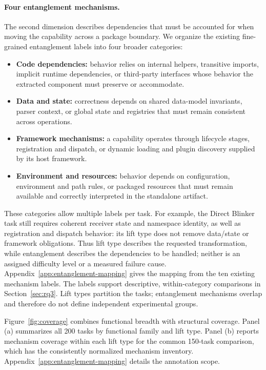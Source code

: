 \documentclass[acmsmall,screen,review,anonymous,nonacm]{acmart}
\begin{document}
\paragraph{Four entanglement mechanisms.}
\label{sec:entanglement}
The second dimension describes dependencies that must be accounted for when
moving the capability across a package boundary. We organize the existing
fine-grained entanglement labels into four broader categories:
\begin{itemize}
 \item \textbf{Code dependencies:} behavior relies on internal helpers,
 transitive imports, implicit runtime dependencies, or third-party interfaces
 whose behavior the extracted component must preserve or accommodate.
 \item \textbf{Data and state:} correctness depends on shared data-model
 invariants, parser context, or global state and registries that must remain
 consistent across operations.
 \item \textbf{Framework mechanisms:} a capability operates through lifecycle
 stages, registration and dispatch, or dynamic loading and plugin discovery
 supplied by its host framework.
 \item \textbf{Environment and resources:} behavior depends on configuration,
 environment and path rules, or packaged resources that must remain available
 and correctly interpreted in the standalone artifact.
\end{itemize}

These categories allow multiple labels per task. For example, the Direct
Blinker task still requires coherent receiver state and namespace identity,
as well as registration and dispatch behavior: its lift type does not remove
data/state or framework obligations. Thus lift type describes the requested
transformation, while entanglement describes the dependencies to be handled;
neither is an assigned difficulty level or a measured failure cause.
Appendix~\ref{app:entanglement-mapping} gives the mapping from the ten existing
mechanism labels. The labels support descriptive, within-category comparisons in
Section~\ref{sec:rq3}. Lift types partition the tasks; entanglement mechanisms
overlap and therefore do not define independent experimental groups.

Figure~\ref{fig:coverage} combines functional breadth with structural coverage.
Panel (a) summarizes all 200 tasks by functional family and lift type.
Panel (b) reports mechanism coverage within each lift type for the common
150-task comparison, which has the consistently normalized mechanism inventory.
Appendix~\ref{app:entanglement-mapping} details the annotation scope.
\end{document}
